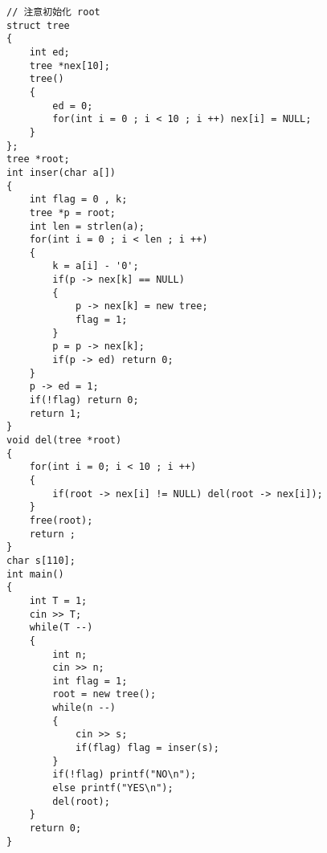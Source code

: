 \documentclass[E:/GsjzTle/main/main.tex]{subfiles}
\begin{document}
\begin{lstlisting}
// 注意初始化 root
struct tree
{
	int ed;
	tree *nex[10];
	tree()
	{
		ed = 0;
		for(int i = 0 ; i < 10 ; i ++) nex[i] = NULL;
	}
};
tree *root;
int inser(char a[])
{
	int flag = 0 , k;
	tree *p = root;
	int len = strlen(a);
	for(int i = 0 ; i < len ; i ++)
	{
		k = a[i] - '0';
		if(p -> nex[k] == NULL)
		{
			p -> nex[k] = new tree;
			flag = 1;
		}
		p = p -> nex[k];
		if(p -> ed) return 0;
	}
	p -> ed = 1;
	if(!flag) return 0;
	return 1;
}
void del(tree *root)
{
	for(int i = 0; i < 10 ; i ++)
	{
		if(root -> nex[i] != NULL) del(root -> nex[i]);
	}
	free(root);
	return ;
}
char s[110];
int main()
{
	int T = 1;
	cin >> T;
	while(T --)
	{
		int n;
		cin >> n;
		int flag = 1;
		root = new tree();
		while(n --)
		{
			cin >> s;
			if(flag) flag = inser(s);
		}
		if(!flag) printf("NO\n");
		else printf("YES\n");
		del(root);
	}
	return 0;
}
\end{lstlisting}
\end{document}
